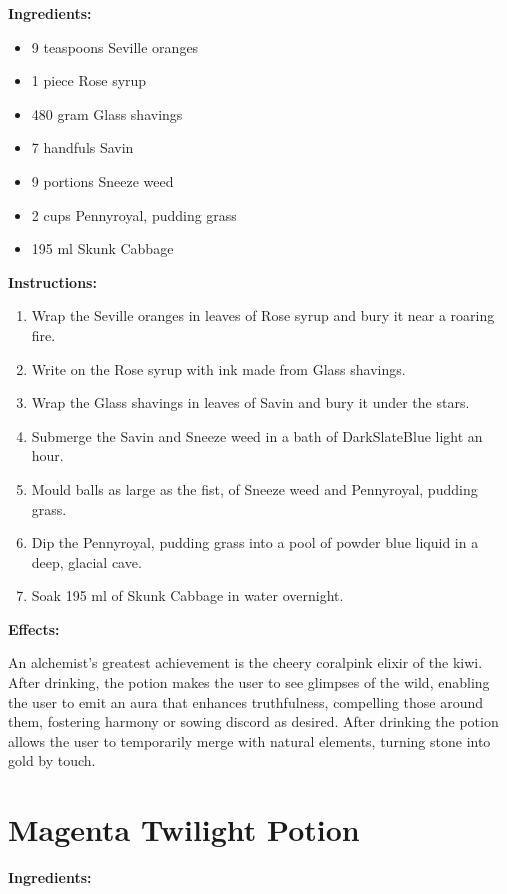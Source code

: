 \documentclass{article}
\begin{document}
\textbf{Ingredients:}

\begin{itemize}
  \item 9 teaspoons Seville oranges
  \item 1 piece Rose syrup
  \item 480 gram Glass shavings
  \item 7 handfuls Savin
  \item 9 portions Sneeze weed
  \item 2 cups Pennyroyal, pudding grass
  \item 195 ml Skunk Cabbage
\end{itemize}

\textbf{Instructions:}

\begin{enumerate}
  \item Wrap the Seville oranges in leaves of Rose syrup and bury it near a roaring fire.
  \item Write on the Rose syrup with ink made from Glass shavings.
  \item Wrap the Glass shavings in leaves of Savin and bury it under the stars.
  \item Submerge the Savin and Sneeze weed in a bath of DarkSlateBlue light an hour.
  \item Mould balls as large as the fist, of Sneeze weed and Pennyroyal, pudding grass.
  \item Dip the Pennyroyal, pudding grass into a pool of powder blue liquid in a deep, glacial cave.
  \item Soak 195 ml of Skunk Cabbage in water overnight.
\end{enumerate}

\textbf{Effects:}

An alchemist's greatest achievement is the cheery coralpink elixir of the kiwi. After drinking, the potion makes the user to see glimpses of the wild, enabling the user to emit an aura that enhances truthfulness, compelling those around them, fostering harmony or sowing discord as desired. After drinking the potion allows the user to temporarily merge with natural elements, turning stone into gold by touch.

\newpage
\section*{Magenta Twilight Potion}

\textbf{Ingredients:}
\end{document}
